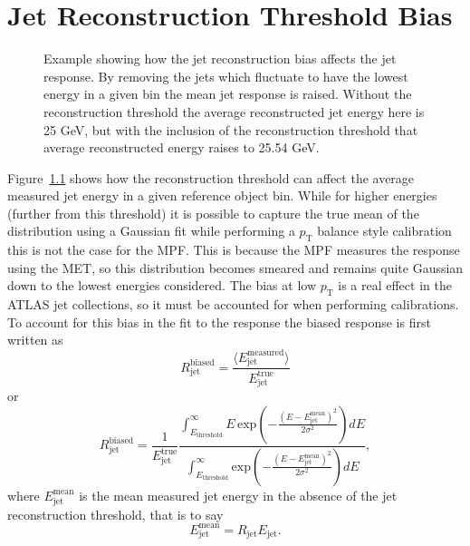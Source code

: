 \chapter{Jet Reconstruction Threshold Bias}
\label{App:LowEBias}

\begin{figure}[!ht]
  \begin{center}
  \end{center}
  \caption[Jet reconstruction threshold bias]
  {\small Example showing how the jet reconstruction bias affects the jet response.  By removing the jets which fluctuate to have the lowest energy in a given bin the mean jet response is raised.  Without the reconstruction threshold the average reconstructed jet energy here is 25 GeV, but with the inclusion of the reconstruction threshold that average reconstructed energy raises to 25.54 GeV. }
  \label{plot:ThesholdBias}
\end{figure}

Figure~\ref{plot:ThesholdBias} shows how the reconstruction threshold can affect the average measured jet energy in a given reference object bin.  
While for higher energies (further from this threshold) it is possible to capture the true mean of the distribution using a Gaussian fit while performing a $p_{\mathrm T}$ balance style calibration this is not the case for the MPF.  
This is because the MPF measures the response using the MET, so this distribution becomes smeared and remains quite Gaussian down to the lowest energies considered.  
The bias at low $p_{\mathrm T}$ is a real effect in the ATLAS jet collections, so it must be accounted for when performing calibrations.  
To account for this bias in the fit to the response the biased response is first written as
\begin{equation}
  R_{\mathrm{jet}}^{\mathrm{biased}} = \frac{\langle E_{\mathrm{jet}}^{\mathrm{measured}}\rangle}{E_{\mathrm{jet}}^{\mathrm{true}}}
\end{equation}
\noindent
or
\begin{equation}
  R_{\mathrm{jet}}^{\mathrm{biased}} = \frac{1}{E_{\mathrm{jet}}^{\mathrm{true}}} \frac{\int_{E_{\mathrm {threshold}}}^{\infty} E\,\mathrm{exp}\left( -\frac{\left(E-E_{\mathrm{jet}}^{\mathrm{mean}}\right)^2}{2\sigma^2}\right) dE}{\int_{E_{\mathrm {threshold}}}^{\infty}\mathrm{exp}\left( -\frac{\left(E-E_{\mathrm{jet}}^{\mathrm{mean}}\right)^2}{2\sigma^2}\right) dE}, 
\end{equation}
\noindent
where $E_{\mathrm{jet}}^{\mathrm{mean}}$ is the mean measured jet energy in the absence of the jet reconstruction threshold, that is to say
\begin{equation}
  E_{\mathrm{jet}}^{\mathrm{mean}} = R_{\mathrm{jet}}E_{\mathrm{jet}}.
  \label{Eq:MeanJet}
\end{equation}


